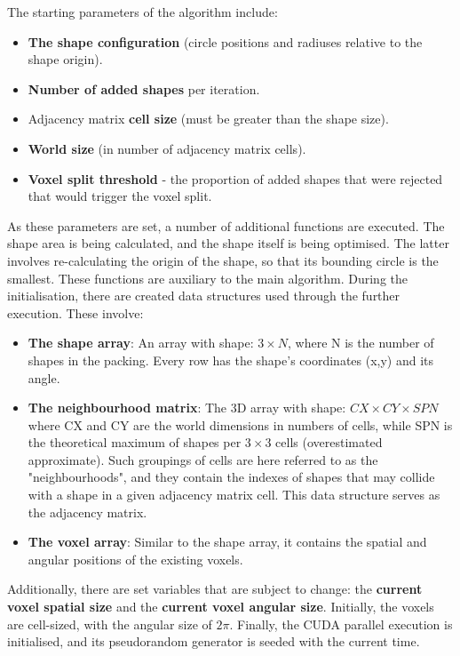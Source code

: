 \documentclass[12pt, oneside]{report}
\begin{document}
The starting parameters of the algorithm include:
\begin{itemize}
  \item \textbf{The shape configuration} (circle positions and radiuses relative to the shape origin).
  \item \textbf{Number of added shapes} per iteration.
  \item Adjacency matrix \textbf{cell size} (must be greater than the shape size).
  \item \textbf{World size} (in number of adjacency matrix cells).
	\item \textbf{Voxel split threshold} - the proportion of added shapes that were rejected that would trigger the voxel split.
\end{itemize}
As these parameters are set, a number of additional functions are executed. The shape area is being calculated, and the shape itself is being optimised. The latter involves re-calculating the origin of the shape, so that its bounding circle is the smallest. These functions are auxiliary to the main algorithm.
\newline
During the initialisation, there are created data structures used through the further execution. These involve:
\begin{itemize}
  \item \textbf{The shape array}: An array with shape: $3 \times N$, where N is the number of shapes in the packing. Every row has the shape's coordinates (x,y) and its angle.
  \item \textbf{The neighbourhood matrix}: The 3D array with shape: $CX \times CY \times SPN$ where CX and CY are the world dimensions in numbers of cells, while SPN is the theoretical maximum of shapes per $3 \times 3$ cells (overestimated approximate). Such groupings of cells are here referred to as the "neighbourhoods", and they contain the indexes of shapes that may collide with a shape in a given adjacency matrix cell. This data structure serves as the adjacency matrix.
  \item \textbf{The voxel array}: Similar to the shape array, it contains the spatial and angular positions of the existing voxels.
\end{itemize}
Additionally, there are set variables that are subject to change: the \textbf{current voxel spatial size} and the \textbf{current voxel angular size}. Initially, the voxels are cell-sized, with the angular size of $2 \pi$.
Finally, the CUDA parallel execution is initialised, and its pseudorandom generator is seeded with the current time.
\end{document}
